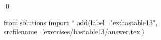 
\begin{ex} 
  \label{ex:hastable13}
  
  \qed
\end{ex} 
\begin{python0}
from solutions import *
add(label="ex:hastable13",
    srcfilename='exercises/hastable13/answer.tex') 
\end{python0}
